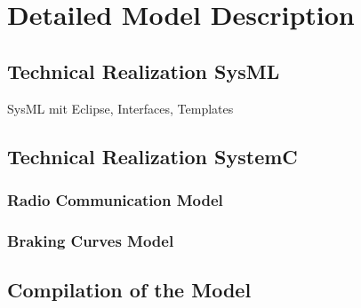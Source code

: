 \documentclass{template/openetcs_article}
\begin{document}
%
%


\section{Detailed Model Description}
\label{sec:deta-model-descr}

\subsection{Technical Realization SysML}
SysML mit Eclipse, Interfaces, Templates

\subsection{Technical Realization SystemC}

\subsubsection{Radio Communication Model}

\subsubsection{Braking Curves Model}



\subsection{Compilation of the Model}



\end{document}
